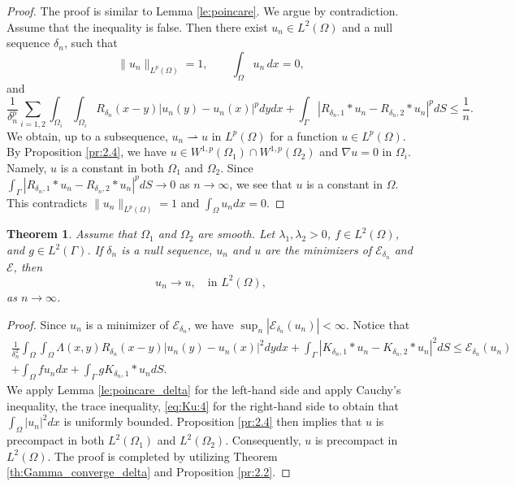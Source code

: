 \documentclass{article}
\newtheorem{theorem}{Theorem}
\theoremstyle{definition}
\begin{document}
\begin{proof}
The proof is similar to Lemma \ref{le:poincare}.
We argue by contradiction.
Assume that the inequality is false.
Then there exist $u_n\in L^2(\Omega)$ and a null sequence $\delta_n$, such that
\[
\|u_n\|_{L^p(\Omega)}=1,
\qquad
\int_\Omega u_n\,dx=0,
\]
and
\[
 \frac{1}{\delta_n^p}\sum_{i=1,2}\int_{\Omega_i}\int_{\Omega_i}R_{\delta_n}(x-y)|u_n(y)-u_n(x)|^pdydx
 + \int_\Gamma |R_{\delta_n,1}\ast u_n-R_{\delta_n,2}\ast u_n|^pdS
\leq \frac{1}{n}.
\]
We obtain, up to a subsequence, $u_n \rightharpoonup u$ in $L^p(\Omega)$ for a function $u\in L^p(\Omega)$.
By Proposition \ref{pr:2.4},
we have $u\in W^{1,p}(\Omega_1)\cap W^{1,p}(\Omega_2)$ and $\nabla u=0$ in $\Omega_i$.
Namely, $u$ is a constant in both $\Omega_1$ and $\Omega_2$.
Since $\int_\Gamma |R_{\delta_n,1}\ast u_n-R_{\delta_n,2}\ast u_n|^pdS \rightarrow 0$ as $n\rightarrow\infty$, we see that $u$ is a constant in $\Omega$.
This contradicts $\|u_n\|_{L^p(\Omega)}=1$ and $\int_\Omega u_ndx=0$.
\end{proof}




\begin{theorem}\label{th:converge_delta}
Assume that $\Omega_1$ and $\Omega_2$ are smooth.
Let $\lambda_1, \lambda_2>0$, $f\in L^2(\Omega)$, and $g\in L^2(\Gamma)$. If $\delta_n$ is a null sequence,
   $u_n$ and $u$ are the minimizers of $\mathcal{E}_{\delta_n}$ and $\mathcal{E}$, then
   \[
   u_n\rightarrow u,\quad \mbox{in } L^2(\Omega),
   \]
   as $n\rightarrow\infty$.
\end{theorem}

\begin{proof}
Since $u_n$ is a minimizer of $\mathcal{E}_{\delta_n}$, we have $\sup_{n}|\mathcal{E}_{\delta_n}(u_n)|<\infty$.
Notice that
\begin{align*}
  \frac{1}{\delta_n^2}\int_{\Omega}\int_{\Omega}\Lambda(x,y)R_{\delta_n}(x-y)|u_n(y)-u_n(x)|^2dydx
  +\int_\Gamma\left|K_{\delta_n,1}\ast u_n-K_{\delta_n,2}\ast u_n\right|^2dS
  \leq \mathcal{E}_{\delta_n}(u_n) \\
  +\int_{\Omega}fu_ndx
  +\int_\Gamma g K_{\delta_n,1}\ast u_n dS.
\end{align*}
We apply Lemma \ref{le:poincare_delta} for the left-hand side and apply Cauchy's inequality, the trace inequality, \eqref{eq:Ku:4} for the right-hand side to obtain that $\int_\Omega |u_n|^2dx$ is uniformly bounded.
Proposition \ref{pr:2.4} then implies that $u$ is precompact in both $L^2(\Omega_1)$ and $L^2(\Omega_2)$.
Consequently, $u$ is precompact in $L^2(\Omega)$.
  The proof is completed by utilizing Theorem \ref{th:Gamma_converge_delta} and Proposition \ref{pr:2.2}.
\end{proof}
\end{document}
